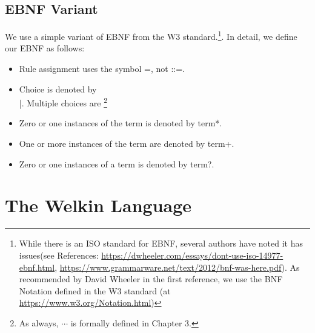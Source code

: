 \subsection{EBNF Variant}
We use a simple variant of EBNF from the W3 standard.\footnote{While there is an ISO standard for EBNF, several authors have noted it has issues(see References: \url{https://dwheeler.com/essays/dont-use-iso-14977-ebnf.html}, \url{https://www.grammarware.net/text/2012/bnf-was-here.pdf}). As recommended by David Wheeler in the first reference, we use the BNF Notation defined in the W3 standard (at \url{https://www.w3.org/Notation.html})}. In detail, we define our EBNF as follows:
\begin{itemize}
	\item Rule assignment uses the symbol =, not ::=.
  \item Choice is denoted by \\|. Multiple choices are \footnote{As always, $\cdots$ is formally defined in Chapter 3.}
  \item Zero or one instances of the term is denoted by term*.
  \item One or more instances of the term are denoted by term+.
  \item Zero or one instances of a term is denoted by term?.
\end{itemize}
\section{The Welkin Language}


